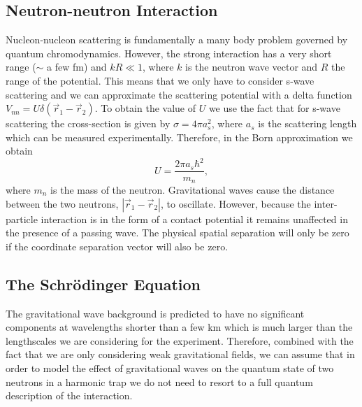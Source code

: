 \subsection{Neutron-neutron Interaction}

Nucleon-nucleon scattering is fundamentally a many body problem
governed by quantum chromodynamics. However, the strong interaction
has a very short range ($\sim$ a few fm) and $kR \ll 1$, where $k$ is
the neutron wave vector and $R$ the range of the potential. This means
that we only have to consider s-wave scattering and we can approximate
the scattering potential with a delta function $V_{nn} =
U\delta(\vec{r}_1 - \vec{r}_2)$. To obtain the value of $U$ we use the
fact that for s-wave scattering the cross-section is given by $\sigma
= 4\pi a_s^2$, where $a_s$ is the scattering length which can be
measured experimentally. Therefore, in the Born approximation we
obtain
\begin{equation}\label{eq:nn}
U = \frac{2 \pi a_s \hbar^2}{m_n},
\end{equation}
where $m_n$ is the mass of the neutron. Gravitational waves cause the
distance between the two neutrons, $|\vec{r}_1 - \vec{r}_2|$, to
oscillate. However, because the inter-particle interaction is in the
form of a contact potential it remains unaffected in the presence of a
passing wave. The physical spatial separation will only be zero if the
coordinate separation vector will also be zero.

\subsection{The Schr\"{o}dinger Equation}

The gravitational wave background is predicted to have no significant
components at wavelengths shorter than a few km which is much larger
than the lengthscales we are considering for the
experiment. Therefore, combined with the fact that we are only
considering weak gravitational fields, we can assume that in order to
model the effect of gravitational waves on the quantum state of two
neutrons in a harmonic trap we do not need to resort to a full quantum
description of the interaction.

